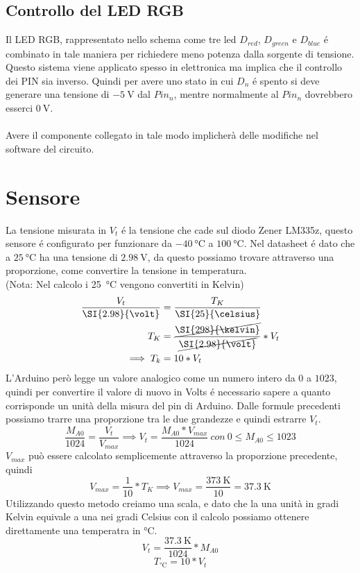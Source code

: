\documentclass[a4paper]{article}
\begin{document}
	\subsection{Controllo del LED RGB}
	Il LED RGB, rappresentato nello schema come tre led $D_{red}$, $D_{green}$ e $D_{blue}$
	é combinato in tale maniera per richiedere meno potenza dalla sorgente di tensione.
	Questo sistema viene applicato spesso in elettronica ma implica che il controllo dei PIN sia
	inverso. Quindi per avere uno stato in cui $D_n$ é spento si deve generare una tensione
	di $\SI{-5}{\volt}$ dal $Pin_n$, mentre normalmente al $Pin_n$ dovrebbero esserci 
	$\SI{0}{\volt}$.\\\\
	Avere il componente collegato in tale modo implicherà delle modifiche nel software
	del circuito.
	
	\section{Sensore}
	La tensione misurata in $V_t$ é la tensione che cade sul diodo Zener LM335z, questo
	sensore é configurato per funzionare da $\SI{-40}{\celsius}$ a $\SI{+100}{\celsius}$.
	Nel datasheet é dato che a $\SI{+25}{\celsius}$ ha una tensione di $\SI{2,98}{\volt}$,
	da questo possiamo trovare attraverso una proporzione, come convertire la tensione in
	temperatura.\\
	(Nota: Nel calcolo i \SI{25}{\celsius} vengono convertiti in Kelvin)
	\begin{align*}
		\frac{V_t}{\SI{2.98}{\volt}} &= \frac{T_K}{\SI{25}{\celsius}}\\
		T_K &= \frac{\cancel{\SI{298}{\kelvin}}}{\cancel{\SI{2.98}{\volt}}}*V_t\\
		\implies T_k &= 10*V_t
	\end{align*}
	L'Arduino però legge un valore analogico come un numero intero da $0$ a $1023$, quindi per
	convertire il valore di nuovo in Volts é necessario sapere a quanto corrisponde un unità
	della misura del pin di Arduino. Dalle formule precedenti possiamo trarre una proporzione
	tra le due grandezze e quindi estrarre $V_t$.
	$$\frac{M_{A0}}{1024} = \frac{V_t}{V_{max}} \implies V_t = \frac{M_{A0} * V_{max}}{1024} ~con~0\leq M_{A0} \leq 1023$$
	$V_{max}$ può essere calcolato semplicemente attraverso la proporzione precedente, quindi
	$$V_{max} = \frac{1}{10}*T_K \implies V_{max} = \frac{\SI{373}{\kelvin}}{10} = \SI{37.3}{\kelvin}$$
	Utilizzando questo metodo creiamo una scala, e dato che la una unità in gradi Kelvin equivale a una nei
	gradi Celsius con il calcolo possiamo ottenere direttamente una temperatra in \si{\celsius}.
	$$V_t = \frac{\SI{37.3}{\kelvin}}{1024} * M_{A0}$$
	$$T_{\si{\celsius}} = 10 * V_t$$
\end{document}
